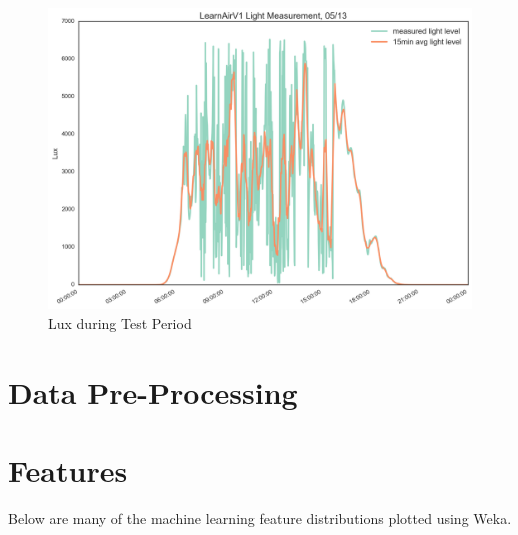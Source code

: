 \begin{figure}[htb]
 	\includegraphics[width=\textwidth]{figs/lux_zoomed}               
 	 \caption{Lux during Test Period}
  	\label{fig:lux_zoomed}
\end{figure}

\FloatBarrier
\section{Data Pre-Processing}
\FloatBarrier

\FloatBarrier
\section{Features}
\FloatBarrier

\enlargethispage{10\baselineskip}

Below are many of the machine learning feature distributions plotted using Weka.

